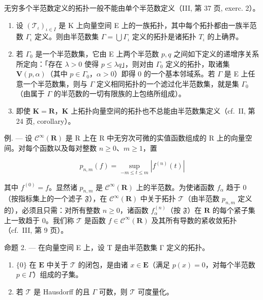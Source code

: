 无穷多个半范数定义的拓扑一般不能由单个半范数定义（III, 第 37 页, exerc. 2）。

\begin{enumerate}
\def\labelenumi{\arabic{enumi})}
\setcounter{enumi}{1}
\item
  设 \((\mathcal{T}_{\iota})_{\iota\in I}\) 是 K 上向量空间 E 上的一族拓扑，其中每个拓扑都由一族半范数 \(\Gamma_{\iota}\) 定义。则由半范数集 \(\Gamma = \bigcup \Gamma_{\iota}\) 定义的拓扑是诸拓扑 \(T_{\iota}\) 的上确界。
\item
  若 \(\Gamma_0\) 是一个半范数集，它由 E 上两个半范数 \(p, q\) 之间如下定义的递增序关系所定向：「存在 \(\lambda > 0\) 使得 \(p \leqslant \lambda q\)」，则对由 \(\Gamma_0\) 定义的拓扑，取诸集 \(\mathbf{V}(p, \alpha)\)（其中 \(p \in \Gamma_0\)，\(\alpha > 0\)）即得 0 的一个基本邻域系。若 \(\Gamma\) 是 E 上任意一个半范数集，则与 \(\Gamma\) 定义相同拓扑的一个滤过化半范数集，就是集 \(\Gamma_0\)（由属于 \(\Gamma\) 的半范数的一切有限族的上包络所组成）。
\item
  即使 \(\mathbf{K} = \mathbf{R}\)，\(\mathbf{K}\) 上拓扑向量空间的拓扑也不总能由半范数集定义（cf.~II, 第 24 页, corollary）。
\end{enumerate}

例. --- 设 \(\mathcal{C}^{\infty}(\mathbf{R})\) 是 R 上在 R 中无穷次可微的实值函数组成的 R 上的向量空间。对每个函数以及每对整数 \(n \geqslant 0\)、\(m \geqslant 1\)，置

\[
p _ {n, m} (f) = \sup _ {- m \leqslant t \leqslant m} | f ^ {(n)} (t) |\tag{2}
\]

其中 \(f^{(0)} = f\)。显然诸 \(p_{n,m}\) 是 \(\mathcal{C}^{\infty}(\mathbf{R})\) 上的半范数。为使诸函数 \(f_{\alpha}\) 趋于 0（按指标集上的一个滤子 \(\mathfrak{F}\)），在 \(\mathcal{C}^{\infty}(\mathbf{R})\) 中关于拓扑 \(\mathcal{T}\)（由半范数 \(p_{n,m}\) 定义的），必须且只需：对所有整数 \(n \geqslant 0\)，诸函数 \(f_{\alpha}^{(n)}\)（按 \(\mathfrak{F}\)）在 \(\mathbf{R}\) 的每个紧子集上一致趋于 0。我们称 \(\mathcal{T}\) 是函数 \(f \in \mathcal{C}^{\infty}(\mathbf{R})\) 及其所有导数的紧收敛拓扑（cf.~III, 第 9 页）。

命题 2. --- 在向量空间 E 上，设 T 是由半范数集 Γ 定义的拓扑。

\begin{enumerate}
\def\labelenumi{(\roman{enumi})}
\item
  \(\{0\}\) 在 \(\mathbf{E}\) 中关于 \(\mathcal{T}\) 的闭包，是由诸 \(x \in \mathbf{E}\)（满足 \(p(x) = 0\)，对每个半范数 \(p \in \Gamma\)）组成的子集。
\item
  若 \(\mathcal{T}\) 是 Hausdorff 的且 \(\Gamma\) 可数，则 \(\mathcal{T}\) 可度量化。
\end{enumerate}

